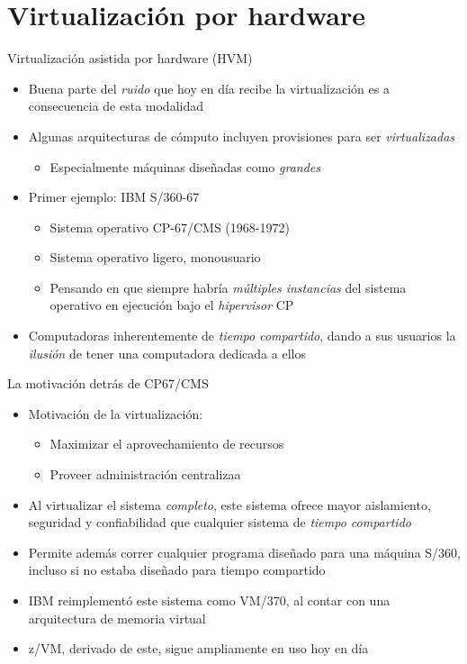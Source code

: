 \documentclass[presentation]{beamer}
\begin{document}
\section{Virtualización por hardware}
\label{sec:org8322fc1}
\begin{frame}[label={sec:orgd3ab02f}]{Virtualización asistida por hardware (HVM)}
\begin{itemize}
\item Buena parte del \emph{ruido} que hoy en día recibe la virtualización es a
consecuencia de esta modalidad
\item Algunas arquitecturas de cómputo incluyen provisiones para ser
\emph{virtualizadas}
\begin{itemize}
\item Especialmente máquinas diseñadas como \emph{grandes}
\end{itemize}
\item Primer ejemplo: IBM S/360-67
\begin{itemize}
\item Sistema operativo CP-67/CMS (1968-1972)
\item Sistema operativo ligero, monousuario
\item Pensando en que siempre habría \emph{múltiples instancias} del sistema
operativo en ejecución bajo el \emph{hipervisor} CP
\end{itemize}
\item Computadoras inherentemente de \emph{tiempo compartido}, dando a sus
usuarios la \emph{ilusión} de tener una computadora dedicada a ellos
\end{itemize}
\end{frame}

\begin{frame}[label={sec:org943ebed}]{La motivación detrás de CP67/CMS}
\begin{itemize}
\item Motivación de la virtualización:
\begin{itemize}
\item Maximizar el aprovechamiento de recursos
\item Proveer administración centralizaa
\end{itemize}
\item Al virtualizar el sistema \emph{completo}, este sistema ofrece mayor
aislamiento, seguridad y confiabilidad que cualquier sistema de
\emph{tiempo compartido}
\item Permite además correr cualquier programa diseñado para una máquina
S/360, incluso si no estaba diseñado para tiempo compartido
\item IBM reimplementó este sistema como VM/370, al contar con una
arquitectura de memoria virtual
\item z/VM, derivado de este, sigue ampliamente en uso hoy en día
\end{itemize}
\end{frame}
\end{document}

